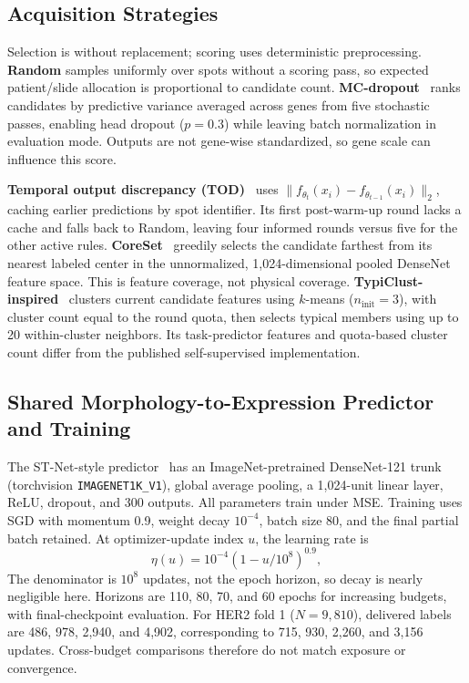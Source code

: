 \documentclass[]{spie}
\begin{document}
\subsection{Acquisition Strategies}
\label{sec:strategies}

Selection is without replacement; scoring uses deterministic preprocessing. \textbf{Random} samples uniformly over spots without a scoring pass, so expected patient/slide allocation is proportional to candidate count. \textbf{MC-dropout}~\cite{gal2016dropout} ranks candidates by predictive variance averaged across genes from five stochastic passes, enabling head dropout ($p=0.3$) while leaving batch normalization in evaluation mode. Outputs are not gene-wise standardized, so gene scale can influence this score.

\textbf{Temporal output discrepancy (TOD)}~\cite{huang2021semi} uses $\|f_{\theta_t}(x_i)-f_{\theta_{t-1}}(x_i)\|_2$, caching earlier predictions by spot identifier. Its first post-warm-up round lacks a cache and falls back to Random, leaving four informed rounds versus five for the other active rules. \textbf{CoreSet}~\cite{sener2018active} greedily selects the candidate farthest from its nearest labeled center in the unnormalized, 1,024-dimensional pooled DenseNet feature space. This is feature coverage, not physical coverage. \textbf{TypiClust-inspired}~\cite{hacohen2022active} clusters current candidate features using $k$-means ($n_{\mathrm{init}}=3$), with cluster count equal to the round quota, then selects typical members using up to 20 within-cluster neighbors. Its task-predictor features and quota-based cluster count differ from the published self-supervised implementation.

\subsection{Shared Morphology-to-Expression Predictor and Training}
\label{sec:predictor}

The ST-Net-style predictor~\cite{he2020integrating} has an ImageNet-pretrained DenseNet-121 trunk~\cite{huang2017densely} (torchvision \texttt{IMAGENET1K\_V1}), global average pooling, a 1,024-unit linear layer, ReLU, dropout, and 300 outputs. All parameters train under MSE. Training uses SGD with momentum 0.9, weight decay $10^{-4}$, batch size 80, and the final partial batch retained. At optimizer-update index $u$, the learning rate is
\begin{equation}
\eta(u)=10^{-4}(1-u/10^8)^{0.9},
\label{eq:lr}
\end{equation}
The denominator is $10^8$ updates, not the epoch horizon, so decay is nearly negligible here. Horizons are 110, 80, 70, and 60 epochs for increasing budgets, with final-checkpoint evaluation. For HER2 fold 1 ($N=9{,}810$), delivered labels are 486, 978, 2,940, and 4,902, corresponding to 715, 930, 2,260, and 3,156 updates. Cross-budget comparisons therefore do not match exposure or convergence.
\end{document}
